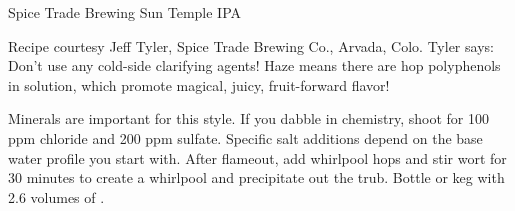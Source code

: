 \begin{recipie}{Spice Trade Brewing Sun Temple IPA}

\begin{aboutblock}
Recipe courtesy Jeff Tyler, Spice Trade Brewing Co., Arvada, Colo. Tyler says:
Don't use any cold-side clarifying agents! Haze means there are hop polyphenols in
solution, which promote magical, juicy, fruit-forward flavor!
\end{aboutblock}


\begin{methodandtiming}
 
\begin{mashsteps}
\end{mashsteps}

\begin{fermentationsteps}
\end{fermentationsteps}

\begin{directions}
Minerals are important for this style. If you dabble in chemistry, shoot for 100 ppm
chloride and 200 ppm sulfate. Specific salt additions depend on the base water profile
you start with. After flameout, add whirlpool hops and stir wort for 30 minutes to
create a whirlpool and precipitate out the trub. Bottle or keg with 2.6 volumes
of .
\end{directions}

\end{methodandtiming}

\pagebreak

\begin{ingredientsblock}

\begin{malts}
\end{malts}

\begin{hops}
\end{hops}


\end{ingredientsblock}
\end{recipie}
